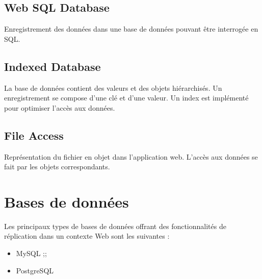 	\subsection{Web SQL Database}
		Enregistrement des données dans une base de données pouvant être interrogée en SQL.

	\subsection{Indexed Database}
		La base de données contient des valeurs et des objets hiérarchisés. Un enregistrement se compose d’une clé et d’une valeur. Un index est implémenté pour optimiser l’accès aux données.

	\subsection{File Access}
		Représentation du fichier en objet dans l’application web. L’accès aux données se fait par les objets correspondants.

\section{Bases de données}
	Les principaux types de bases de données offrant des fonctionnalités de réplication dans un contexte Web sont les suivantes :

	\begin{itemize}
		\item MySQL ;;
		\item PostgreSQL
	\end{itemize}